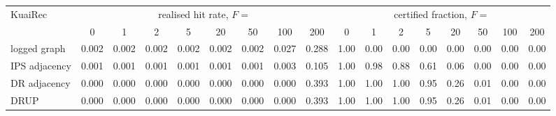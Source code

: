 \begin{tabular}{lcccccccc|cccccccc}
\toprule
KuaiRec & \multicolumn{8}{c|}{realised hit rate, $F=$} & \multicolumn{8}{c}{certified fraction, $F=$}\\
 & 0 & 1 & 2 & 5 & 20 & 50 & 100 & 200 & 0 & 1 & 2 & 5 & 20 & 50 & 100 & 200\\
\midrule
logged graph & 0.002 & 0.002 & 0.002 & 0.002 & 0.002 & 0.002 & 0.027 & 0.288 & 1.00 & 0.00 & 0.00 & 0.00 & 0.00 & 0.00 & 0.00 & 0.00\\
IPS adjacency & 0.001 & 0.001 & 0.001 & 0.001 & 0.001 & 0.001 & 0.003 & 0.105 & 1.00 & 0.98 & 0.88 & 0.61 & 0.06 & 0.00 & 0.00 & 0.00\\
DR adjacency & 0.000 & 0.000 & 0.000 & 0.000 & 0.000 & 0.000 & 0.000 & 0.393 & 1.00 & 1.00 & 1.00 & 0.95 & 0.26 & 0.01 & 0.00 & 0.00\\
DRUP & 0.000 & 0.000 & 0.000 & 0.000 & 0.000 & 0.000 & 0.000 & 0.393 & 1.00 & 1.00 & 1.00 & 0.95 & 0.26 & 0.01 & 0.00 & 0.00\\
\bottomrule
\end{tabular}
